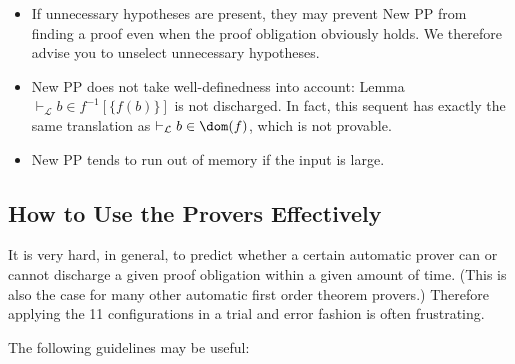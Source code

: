 \begin{description}
\begin{itemize}
		\item If unnecessary hypotheses are present, they may prevent New PP from finding a proof even when the proof obligation obviously holds. We therefore advise you to unselect unnecessary hypotheses.
		\item New PP does not take well-definedness into account:
	        Lemma $\vdash_{\mathcal L} b \in f^{-1} [\{f(b)\}]$ is not discharged. In fact, this sequent has exactly the same translation as $\vdash_{\mathcal L} b \in\dom(f)$, which is not provable. 
		\item New PP tends to run out of memory if the input is large. 
	\end{itemize}
\end{description}

\subsection{How to Use the Provers Effectively}
\label{use_provers_effectively}

It is very hard, in general, to predict whether a certain automatic prover can or cannot discharge a given proof obligation within a given amount of time. (This is also the case for many other automatic first order theorem provers.) Therefore applying the 11 configurations in a trial and error fashion is often frustrating.

The following guidelines may be useful:

